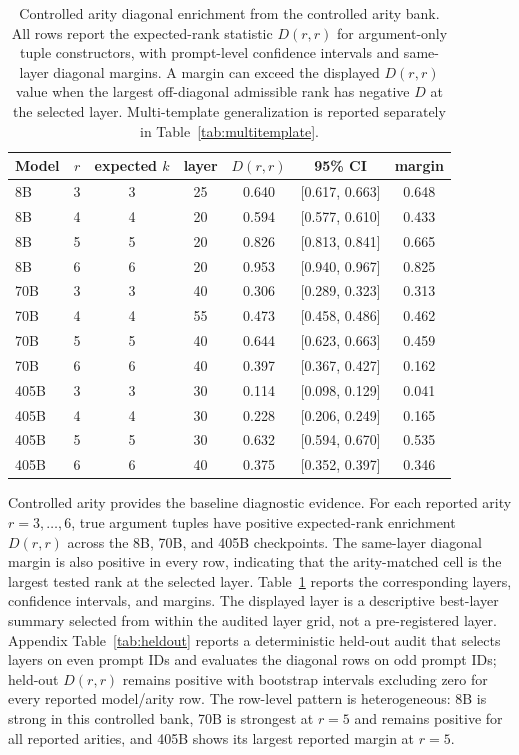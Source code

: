 \documentclass[11pt]{article}
\begin{document}
\begin{table}[!htb]
\centering
\small
\begin{tabular}{lcccccc}
\toprule
Model & $r$ & expected $k$ & layer & $D(r,r)$ & 95\% CI & margin \\
\midrule
8B & 3 & 3 & 25 & 0.640 & [0.617, 0.663] & 0.648 \\
8B & 4 & 4 & 20 & 0.594 & [0.577, 0.610] & 0.433 \\
8B & 5 & 5 & 20 & 0.826 & [0.813, 0.841] & 0.665 \\
8B & 6 & 6 & 20 & 0.953 & [0.940, 0.967] & 0.825 \\
70B & 3 & 3 & 40 & 0.306 & [0.289, 0.323] & 0.313 \\
70B & 4 & 4 & 55 & 0.473 & [0.458, 0.486] & 0.462 \\
70B & 5 & 5 & 40 & 0.644 & [0.623, 0.663] & 0.459 \\
70B & 6 & 6 & 40 & 0.397 & [0.367, 0.427] & 0.162 \\
405B & 3 & 3 & 30 & 0.114 & [0.098, 0.129] & 0.041 \\
405B & 4 & 4 & 30 & 0.228 & [0.206, 0.249] & 0.165 \\
405B & 5 & 5 & 30 & 0.632 & [0.594, 0.670] & 0.535 \\
405B & 6 & 6 & 40 & 0.375 & [0.352, 0.397] & 0.346 \\
\bottomrule
\end{tabular}
\caption{Controlled arity diagonal enrichment from the controlled arity bank. All rows report the expected-rank statistic $D(r,r)$ for argument-only tuple constructors, with prompt-level confidence intervals and same-layer diagonal margins. A margin can exceed the displayed $D(r,r)$ value when the largest off-diagonal admissible rank has negative $D$ at the selected layer. Multi-template generalization is reported separately in Table~\ref{tab:multitemplate}.}
\label{tab:arity-main}
\end{table}

Controlled arity provides the baseline diagnostic evidence. For each reported arity $r=3,\ldots,6$, true argument tuples have positive expected-rank enrichment $D(r,r)$ across the 8B, 70B, and 405B checkpoints. The same-layer diagonal margin is also positive in every row, indicating that the arity-matched cell is the largest tested rank at the selected layer. Table~\ref{tab:arity-main} reports the corresponding layers, confidence intervals, and margins. The displayed layer is a descriptive best-layer summary selected from within the audited layer grid, not a pre-registered layer. Appendix Table~\ref{tab:heldout} reports a deterministic held-out audit that selects layers on even prompt IDs and evaluates the diagonal rows on odd prompt IDs; held-out $D(r,r)$ remains positive with bootstrap intervals excluding zero for every reported model/arity row. The row-level pattern is heterogeneous: 8B is strong in this controlled bank, 70B is strongest at $r=5$ and remains positive for all reported arities, and 405B shows its largest reported margin at $r=5$.
\end{document}
